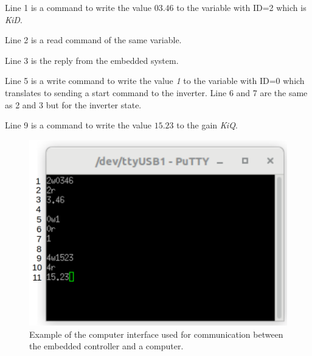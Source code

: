 Line 1 is a command to write the value $03.46$ to the variable with ID=2 which is \textit{Ki\textunderscore D}. 

Line 2 is a read command of the same variable. 

Line 3 is the reply from the embedded system.

Line 5 is a write command to write the value \textit{1} to the variable with ID=0 which translates to sending a start command to the inverter. Line 6 and 7 are the same as 2 and 3 but for the inverter state.

Line 9 is a command to write the value $15.23$ to the gain \textit{Ki\textunderscore Q}.

\begin{figure}[H]
	\centering
	\includegraphics[width=0.6\linewidth]{pictures/software/pc_interface_terminal.png}
	\caption{Example of the computer interface used for communication between the embedded controller and a computer.}
	\label{fig:pc_interface}
\end{figure}